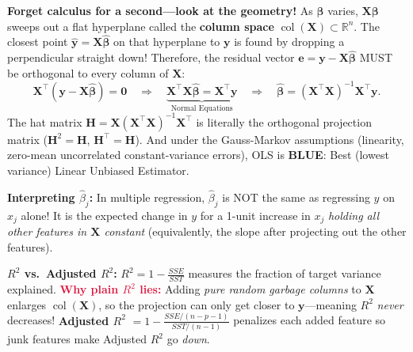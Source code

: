 \documentclass[11pt, a4paper]{article}
\begin{document}
\textbf{Forget calculus for a second---look at the geometry!} As $\boldsymbol{\beta}$ varies, $\mathbf{X}\boldsymbol{\beta}$ sweeps out a flat hyperplane called the \textbf{column space} $\operatorname{col}(\mathbf{X}) \subset \mathbb{R}^n$. The closest point $\hat{\mathbf{y}} = \mathbf{X}\hat{\boldsymbol{\beta}}$ on that hyperplane to $\mathbf{y}$ is found by dropping a perpendicular straight down! Therefore, the residual vector $\mathbf{e} = \mathbf{y} - \mathbf{X}\hat{\boldsymbol{\beta}}$ MUST be orthogonal to every column of $\mathbf{X}$:
\[
    \mathbf{X}^\top (\mathbf{y} - \mathbf{X}\hat{\boldsymbol{\beta}}) = \mathbf{0}
    \quad \Longrightarrow \quad
    \underbrace{\mathbf{X}^\top \mathbf{X} \hat{\boldsymbol{\beta}} = \mathbf{X}^\top \mathbf{y}}_{\text{Normal Equations}}
    \quad \Longrightarrow \quad
    \hat{\boldsymbol{\beta}} = (\mathbf{X}^\top \mathbf{X})^{-1} \mathbf{X}^\top \mathbf{y}.
\]
The hat matrix $\mathbf{H} = \mathbf{X}(\mathbf{X}^\top \mathbf{X})^{-1}\mathbf{X}^\top$ is literally the orthogonal projection matrix ($\mathbf{H}^2 = \mathbf{H}$, $\mathbf{H}^\top = \mathbf{H}$). And under the Gauss-Markov assumptions (linearity, zero-mean uncorrelated constant-variance errors), OLS is \textbf{BLUE}: Best (lowest variance) Linear Unbiased Estimator.

\textbf{Interpreting $\hat{\beta}_j$:} In multiple regression, $\hat{\beta}_j$ is NOT the same as regressing $y$ on $x_j$ alone! It is the expected change in $y$ for a 1-unit increase in $x_j$ \emph{holding all other features in $\mathbf{X}$ constant} (equivalently, the slope after projecting out the other features).

\textbf{$R^2$ vs.\ Adjusted $R^2$:} $R^2 = 1 - \frac{SSE}{SST}$ measures the fraction of target variance explained. \textcolor{crimson}{\textbf{Why plain $R^2$ lies:}} Adding \emph{pure random garbage columns} to $\mathbf{X}$ enlarges $\operatorname{col}(\mathbf{X})$, so the projection can only get closer to $\mathbf{y}$---meaning $R^2$ \emph{never} decreases! \textbf{Adjusted $R^2$} $= 1 - \frac{SSE/(n-p-1)}{SST/(n-1)}$ penalizes each added feature so junk features make Adjusted $R^2$ go \emph{down}.
\end{document}
